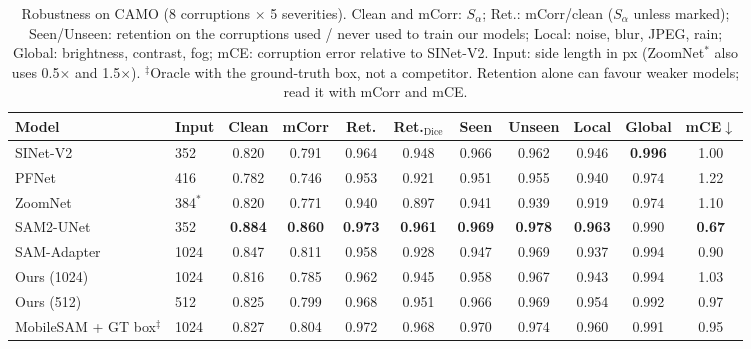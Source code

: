 \begin{table}[t]
\centering
\caption{Robustness on CAMO (8 corruptions $\times$ 5 severities). Clean and mCorr: $S_\alpha$; Ret.: mCorr/clean ($S_\alpha$ unless marked); Seen/Unseen: retention on the corruptions used / never used to train our models; Local: noise, blur, JPEG, rain; Global: brightness, contrast, fog; mCE: corruption error relative to SINet-V2. Input: side length in px (ZoomNet$^*$ also uses 0.5$\times$ and 1.5$\times$). $^\ddagger$Oracle with the ground-truth box, not a competitor. Retention alone can favour weaker models; read it with mCorr and mCE.}
\label{tab:robust-camo}
\footnotesize
\setlength{\tabcolsep}{4pt}
\begin{tabular}{llccccccccc}
\toprule
Model & Input & Clean & mCorr & Ret. & Ret.$_{\mathrm{Dice}}$ & Seen & Unseen & Local & Global & mCE$\downarrow$ \\
\midrule
SINet-V2 & 352 & 0.820 & 0.791 & 0.964 & 0.948 & 0.966 & 0.962 & 0.946 & \textbf{0.996} & 1.00 \\
PFNet & 416 & 0.782 & 0.746 & 0.953 & 0.921 & 0.951 & 0.955 & 0.940 & 0.974 & 1.22 \\
ZoomNet & 384$^*$ & 0.820 & 0.771 & 0.940 & 0.897 & 0.941 & 0.939 & 0.919 & 0.974 & 1.10 \\
\midrule
SAM2-UNet & 352 & \textbf{0.884} & \textbf{0.860} & \textbf{0.973} & \textbf{0.961} & \textbf{0.969} & \textbf{0.978} & \textbf{0.963} & 0.990 & \textbf{0.67} \\
SAM-Adapter & 1024 & 0.847 & 0.811 & 0.958 & 0.928 & 0.947 & 0.969 & 0.937 & 0.994 & 0.90 \\
\midrule
Ours (1024) & 1024 & 0.816 & 0.785 & 0.962 & 0.945 & 0.958 & 0.967 & 0.943 & 0.994 & 1.03 \\
Ours (512) & 512 & 0.825 & 0.799 & 0.968 & 0.951 & 0.966 & 0.969 & 0.954 & 0.992 & 0.97 \\
\midrule
MobileSAM + GT box$^\ddagger$ & 1024 & 0.827 & 0.804 & 0.972 & 0.968 & 0.970 & 0.974 & 0.960 & 0.991 & 0.95 \\
\bottomrule
\end{tabular}
\end{table}
